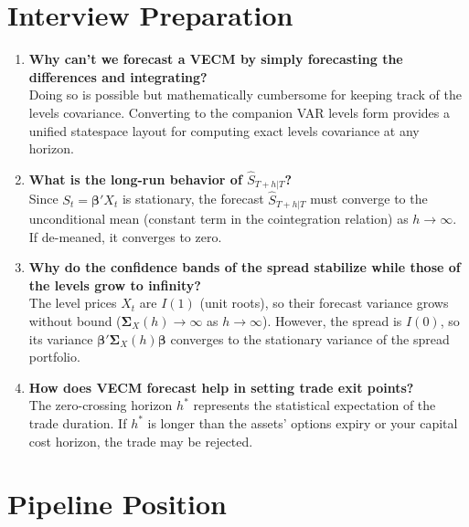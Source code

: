\documentclass[10pt,a4paper,twocolumn]{article}
\newcommand{\bbeta}{\boldsymbol{\beta}}
\newcommand{\bSigma}{\boldsymbol{\Sigma}}
\begin{document}
\section{Interview Preparation}

\begin{tcolorbox}[exbox={Key VECM Forecasting Questions}]
\begin{enumerate}\setlength\itemsep{1pt}
  \item \textbf{Why can't we forecast a VECM by simply forecasting the differences and integrating?}\\
    Doing so is possible but mathematically cumbersome for keeping track of the levels covariance. Converting to the companion VAR levels form provides a unified statespace layout for computing exact levels covariance at any horizon.
  \item \textbf{What is the long-run behavior of $\hat{S}_{T+h|T}$?}\\
    Since $S_t = \bbeta' X_t$ is stationary, the forecast $\hat{S}_{T+h|T}$ must converge to the unconditional mean (constant term in the cointegration relation) as $h \to \infty$. If de-meaned, it converges to zero.
  \item \textbf{Why do the confidence bands of the spread stabilize while those of the levels grow to infinity?}\\
    The level prices $X_t$ are $I(1)$ (unit roots), so their forecast variance grows without bound ($\bSigma_X(h) \to \infty$ as $h \to \infty$). However, the spread is $I(0)$, so its variance $\bbeta'\bSigma_X(h)\bbeta$ converges to the stationary variance of the spread portfolio.
  \item \textbf{How does VECM forecast help in setting trade exit points?}\\
    The zero-crossing horizon $h^*$ represents the statistical expectation of the trade duration. If $h^*$ is longer than the assets' options expiry or your capital cost horizon, the trade may be rejected.
\end{enumerate}
\end{tcolorbox}

\section{Pipeline Position}
\end{document}
